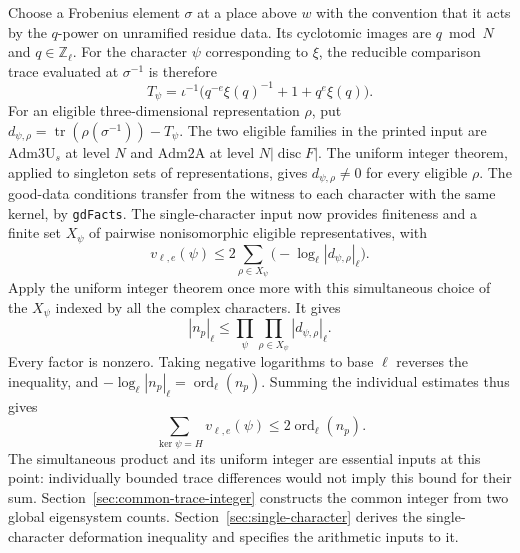 Choose a Frobenius element \(\sigma\) at a place above \(w\) with
the convention that it acts by the \(q\)-power on unramified residue
data. Its cyclotomic images are \(q\bmod N\) and \(q\in\mathbb Z_\ell\).
For the character \(\psi\) corresponding to \(\xi\), the
reducible comparison trace evaluated at \(\sigma^{-1}\) is therefore
\[
 T_\psi=\iota^{-1}\big(q^{-e}\xi(q)^{-1}+1+q^e\xi(q)\big).
\]
For an eligible three-dimensional representation \(\rho\), put
\(d_{\psi,\rho}=\operatorname{tr}(\rho(\sigma^{-1}))-T_\psi\).
The two eligible families in the printed input are
\(\mathrm{Adm3U}_{s}\) at level \(N\) and \(\mathrm{Adm2A}\) at
level \(N|\operatorname{disc}F|\). The uniform integer theorem,
applied to singleton sets of representations, gives
\(d_{\psi,\rho}\ne0\) for every eligible \(\rho\). The good-data
conditions transfer from the witness to each character with the same
kernel, by \texttt{gd\allowbreak{}Facts}. The single-character input now provides
finiteness and a finite set \(X_\psi\) of pairwise nonisomorphic
eligible representatives, with
\[
       v_{\ell,e}(\psi)\le
              2\sum_{\rho\in X_\psi}
                 \bigl(-\log_\ell|d_{\psi,\rho}|_\ell\bigr).
\]
Apply the uniform integer theorem once more with this simultaneous
choice of the \(X_\psi\) indexed by all the complex characters. It gives
\[
       |n_p|_\ell\le\prod_{\psi}\prod_{\rho\in X_\psi}
                                      |d_{\psi,\rho}|_\ell .
\]
Every factor is nonzero. Taking negative logarithms to base \(\ell\)
reverses the inequality, and
\(-\log_\ell|n_p|_\ell=\operatorname{ord}_\ell(n_p)\).
Summing the individual estimates thus gives
\[
              \sum_{\ker\psi=H}v_{\ell,e}(\psi)
                         \le2\operatorname{ord}_\ell(n_p).
\]
The simultaneous product and its uniform integer are essential inputs
at this point: individually bounded trace differences would not imply
this bound for their sum. Section~\ref{sec:common-trace-integer} constructs the common integer
from two global eigensystem counts. Section~\ref{sec:single-character} derives the single-character
deformation inequality and specifies the arithmetic inputs to it.
